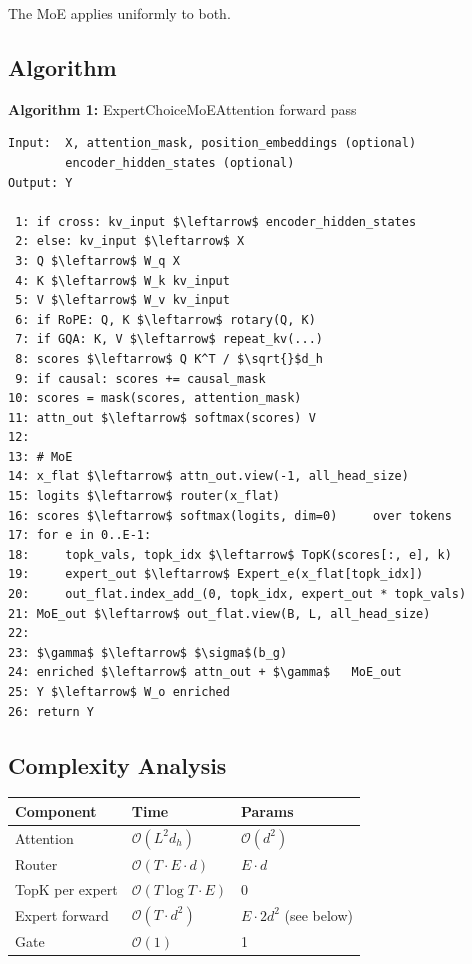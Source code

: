 The MoE applies uniformly to both.

\subsection{Algorithm}

\textbf{Algorithm 1:} ExpertChoiceMoEAttention forward pass
\begin{lstlisting}
Input:  X, attention_mask, position_embeddings (optional)
        encoder_hidden_states (optional)
Output: Y

 1: if cross: kv_input $\leftarrow$ encoder_hidden_states
 2: else: kv_input $\leftarrow$ X
 3: Q $\leftarrow$ W_q X
 4: K $\leftarrow$ W_k kv_input
 5: V $\leftarrow$ W_v kv_input
 6: if RoPE: Q, K $\leftarrow$ rotary(Q, K)
 7: if GQA: K, V $\leftarrow$ repeat_kv(...)
 8: scores $\leftarrow$ Q K^T / $\sqrt{}$d_h
 9: if causal: scores += causal_mask
10: scores = mask(scores, attention_mask)
11: attn_out $\leftarrow$ softmax(scores) V
12:
13: # MoE
14: x_flat $\leftarrow$ attn_out.view(-1, all_head_size)
15: logits $\leftarrow$ router(x_flat)
16: scores $\leftarrow$ softmax(logits, dim=0)     over tokens
17: for e in 0..E-1:
18:     topk_vals, topk_idx $\leftarrow$ TopK(scores[:, e], k)
19:     expert_out $\leftarrow$ Expert_e(x_flat[topk_idx])
20:     out_flat.index_add_(0, topk_idx, expert_out * topk_vals)
21: MoE_out $\leftarrow$ out_flat.view(B, L, all_head_size)
22:
23: $\gamma$ $\leftarrow$ $\sigma$(b_g)
24: enriched $\leftarrow$ attn_out + $\gamma$   MoE_out
25: Y $\leftarrow$ W_o enriched
26: return Y
\end{lstlisting}

\subsection{Complexity Analysis}

\begin{table}[H]
\centering
\small
\begin{tabular}{lll}
\toprule
\textbf{Component} & \textbf{Time} & \textbf{Params} \\
\midrule
Attention & $\mathcal{O}(L^2 d_h)$ & $\mathcal{O}(d^2)$ \\
Router & $\mathcal{O}(T \cdot E \cdot d)$ & $E \cdot d$ \\
TopK per expert & $\mathcal{O}(T \log T \cdot E)$ & 0 \\
Expert forward & $\mathcal{O}(T \cdot d^2)$ & $E \cdot 2d^2$ (see below) \\
Gate & $\mathcal{O}(1)$ & 1 \\
\bottomrule
\end{tabular}
\end{table}

